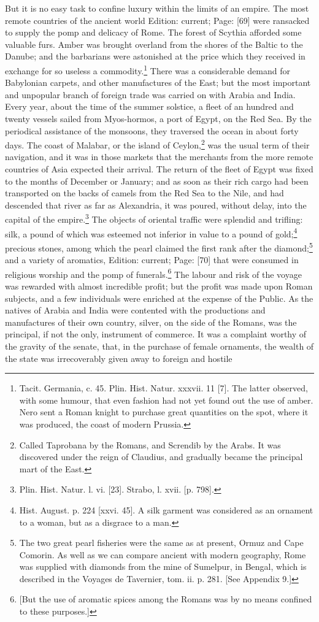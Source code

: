 But it is no easy task to confine luxury within the limits of an empire. The most remote countries of the ancient world Edition: current; Page: [69] were ransacked to supply the pomp and delicacy of Rome. The forest of Scythia afforded some valuable furs. Amber was brought overland from the shores of the Baltic to the Danube; and the barbarians were astonished at the price which they received in exchange for so useless a commodity.\footnote{Tacit. Germania, c. 45. Plin. Hist. Natur. xxxvii. 11 [7]. The latter observed, with some humour, that even fashion had not yet found out the use of amber. Nero sent a Roman knight to purchase great quantities on the spot, where it was produced, the coast of modern Prussia.} There was a considerable demand for Babylonian carpets, and other manufactures of the East; but the most important and unpopular branch of foreign trade was carried on with Arabia and India. Every year, about the time of the summer solstice, a fleet of an hundred and twenty vessels sailed from Myos-hormos, a port of Egypt, on the Red Sea. By the periodical assistance of the monsoons, they traversed the ocean in about forty days. The coast of Malabar, or the island of Ceylon,\footnote{Called Taprobana by the Romans, and Screndib by the Arabs. It was discovered under the reign of Claudius, and gradually became the principal mart of the East.} was the usual term of their navigation, and it was in those markets that the merchants from the more remote countries of Asia expected their arrival. The return of the fleet of Egypt was fixed to the months of December or January; and as soon as their rich cargo had been transported on the backs of camels from the Red Sea to the Nile, and had descended that river as far as Alexandria, it was poured, without delay, into the capital of the empire.\footnote{Plin. Hist. Natur. l. vi. [23]. Strabo, l. xvii. [p. 798].} The objects of oriental traffic were splendid and trifling: silk, a pound of which was esteemed not inferior in value to a pound of gold;\footnote{Hist. August. p. 224 [xxvi. 45]. A silk garment was considered as an ornament to a woman, but as a disgrace to a man.} precious stones, among which the pearl claimed the first rank after the diamond;\footnote{The two great pearl fisheries were the same as at present, Ormuz and Cape Comorin. As well as we can compare ancient with modern geography, Rome was supplied with diamonds from the mine of Sumelpur, in Bengal, which is described in the Voyages de Tavernier, tom. ii. p. 281. [See Appendix 9.]} and a variety of aromatics, Edition: current; Page: [70] that were consumed in religious worship and the pomp of funerals.\footnote{[But the use of aromatic spices among the Romans was by no means confined to these purposes.]} The labour and risk of the voyage was rewarded with almost incredible profit; but the profit was made upon Roman subjects, and a few individuals were enriched at the expense of the Public. As the natives of Arabia and India were contented with the productions and manufactures of their own country, silver, on the side of the Romans, was the principal, if not the only, instrument of commerce. It was a complaint worthy of the gravity of the senate, that, in the purchase of female ornaments, the wealth of the state was irrecoverably given away to foreign and hostile 